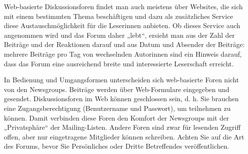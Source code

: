 \documentclass[]{book}
\theoremstyle{definition}
\theoremstyle{definition}
\theoremstyle{definition}
\theoremstyle{remark}
\begin{document}
Web-basierte Diskussionsforen findet man auch meistens über Websites,
die sich mit einem bestimmten Thema beschäftigen und dazu als
zusätzliches Service diese Austauschmöglichkeit für die Leserinnen
anbieten. Ob dieses Service auch angenommen wird und das Forum daher
„lebt``, ersieht man aus der Zahl der Beiträge und der Reaktionen darauf
und aus Datum und Absender der Beiträge: mehrere Beiträge pro Tag von
wechselnden Autorinnen sind ein Hinweis darauf, dass das Forum eine
ausreichend breite und interessierte Leserschaft erreicht.

In Bedienung und Umgangsformen unterscheiden sich web-basierte Foren
nicht von den Newsgroups. Beiträge werden über Web-Formulare eingegeben
und gesendet. Diskussionsforen im Web können geschlossen sein, d. h. Sie
brauchen eine Zugangsberechtigung (Benutzername und Passwort), um
teilnehmen zu können. Damit verbinden diese Foren den Komfort der
Newsgroups mit der „Privatsphäre`` der Mailing-Listen. Andere Foren sind
zwar für lesenden Zugriff offen, aber nur eingetragene Mitglieder können
schreiben. Achten Sie auf die Art des Forums, bevor Sie Persönliches
oder Dritte Betreffendes veröffentlichen.
\end{document}
